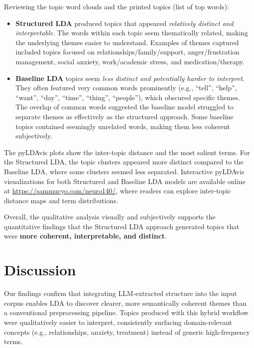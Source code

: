 \documentclass{article}
\begin{document}
Reviewing the topic word clouds and the printed topics (list of top words):
\begin{itemize}[leftmargin=*]
    \item \textbf{Structured LDA} produced topics that appeared \emph{relatively distinct and interpretable}. The words within each topic seem thematically related, making the underlying themes easier to understand. Examples of themes captured included topics focused on relationships/family/support, anger/frustration management, social anxiety, work/academic stress, and medication/therapy.
    \item \textbf{Baseline LDA} topics seem \emph{less distinct and potentially harder to interpret}. They often featured very common words prominently (e.g., ``tell'', ``help'', ``want'', ``day'', ``time'', ``thing'', ``people''), which obscured specific themes. The overlap of common words suggested the baseline model struggled to separate themes as effectively as the structured approach. Some baseline topics contained seemingly unrelated words, making them less coherent subjectively.
\end{itemize}

The pyLDAvis plots show the inter-topic distance and the most salient terms. For the Structured LDA, the topic clusters appeared more distinct compared to the Baseline LDA, where some clusters seemed less separated. Interactive pyLDAvis visualizations for both Structured and Baseline LDA models are available online at \url{https://sammucyo.com/neuro140/}, where readers can explore inter-topic distance maps and term distributions.

Overall, the qualitative analysis visually and subjectively supports the quantitative findings that the Structured LDA approach generated topics that were \textbf{more coherent, interpretable, and distinct}.

\section{Discussion}


Our findings confirm that integrating LLM‑extracted structure into the input corpus enables LDA to discover clearer, more semantically coherent themes than a conventional preprocessing pipeline.  Topics produced with this hybrid workflow were qualitatively easier to interpret, consistently surfacing domain‑relevant concepts (e.g., relationships, anxiety, treatment) instead of generic high‑frequency terms.
\end{document}
